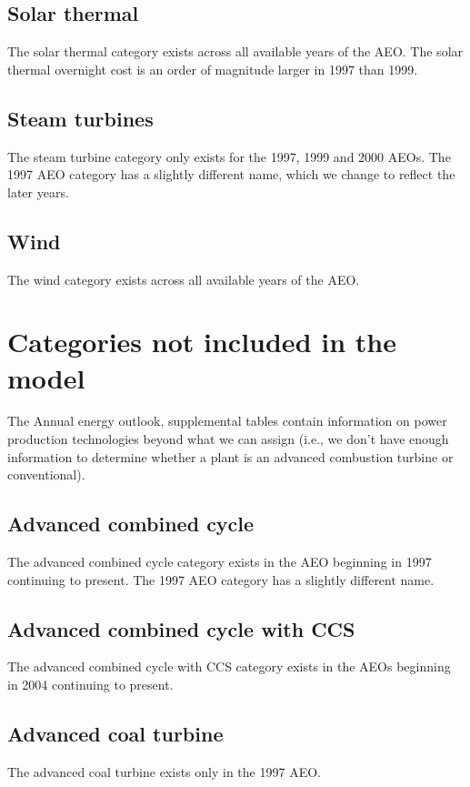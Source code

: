 \documentclass[10pt]{report}
\begin{document}
\subsection{Solar thermal}
The solar thermal category exists across all available years of the AEO. 
The solar thermal overnight cost is an order of magnitude larger in 1997 than 1999.

\subsection{Steam turbines}
The steam turbine category only exists for the 1997, 1999 and 2000 AEOs.
The 1997 AEO category has a slightly different name, which we change to reflect the later years. 

\subsection{Wind}
The wind category exists across all available years of the AEO. 


\section{Categories not included in the model}
The Annual energy outlook, supplemental tables contain information on power production technologies beyond what we can assign (i.e., we don't have enough information to determine whether a plant is an advanced combustion turbine or conventional). 

\subsection{Advanced combined cycle}
The advanced combined cycle category exists in the AEO beginning in 1997 continuing to present.
The 1997 AEO category has a slightly different name.  

\subsection{Advanced combined cycle with CCS}
The advanced combined cycle with CCS category exists in the AEOs beginning in 2004 continuing to present.

\subsection{Advanced coal turbine}
The advanced coal turbine exists only in the 1997 AEO. 
\end{document}

